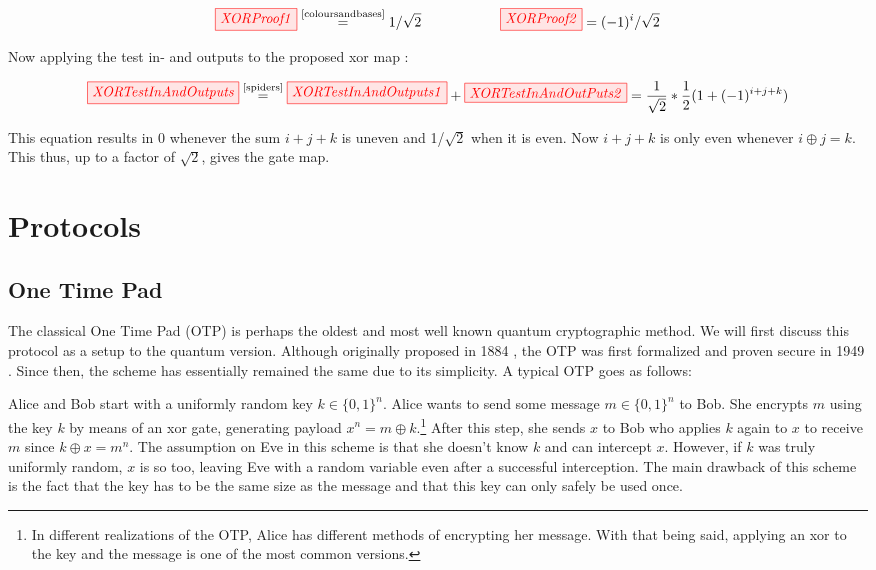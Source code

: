 \documentclass[]{article}
\newcommand{\equaltext}[1]{\ensuremath{\stackrel{\text{#1}}{=}}}
\begin{document}
\begin{equation}
	\tikzfig{XORProof1} \equaltext{\ref{coloursandbases}} 1/\sqrt{2} ~~~~~~~~~~~~~~~~~ \tikzfig{XORProof2} = (-1)^i/\sqrt{2}
\end{equation}

Now applying the test in- and outputs to the proposed xor map \cite{Coecke2017}:

\begin{equation}
	\tikzfig{XORTestInAndOutputs} \equaltext{\ref{spiders}} \tikzfig{XORTestInAndOutputs1} + \tikzfig{XORTestInAndOutPuts2} = \frac{1}{\sqrt{2}} * \frac{1}{2}(1+(-1)^{i+j+k})
\end{equation}

This equation results in 0 whenever the sum $i+j+k$ is uneven and 1/$\sqrt{2}$ when it is even. Now $i+j+k$ is only even whenever $i \oplus j = k$. This thus, up to a factor of $\sqrt{2}$, gives the gate map.

\section{Protocols}


\subsection{One Time Pad}

The classical One Time Pad (OTP) is perhaps the oldest and most well known quantum cryptographic method. We will first discuss this protocol as a setup to the quantum version. Although originally proposed in 1884 \cite{Markoff2011}, the OTP was first formalized and proven secure in 1949 \cite{Shannon1949}. Since then, the scheme has essentially remained the same due to its simplicity. A typical OTP goes as follows:

Alice and Bob start with a uniformly random key $k \in \{0,1\}^n$. Alice wants to send some message $m \in \{0,1\}^n$ to Bob. She encrypts $m$ using the key $k$ by means of an xor gate, generating payload $x^n = m \oplus k$.\footnote{In different realizations of the OTP, Alice has different methods of encrypting her message. With that being said, applying an xor to the key and the message is one of the most common versions.} After this step, she sends $x$ to Bob who applies $k$ again to $x$ to receive $m$ since $k \oplus x = m^n$. The assumption on Eve in this scheme is that she doesn't know $k$ and can intercept $x$. However, if $k$ was truly uniformly random, $x$ is so too, leaving Eve with a random variable even after a successful interception. The main drawback of this scheme is the fact that the key has to be the same size as the message and that this key can only safely be used once.
\end{document}
